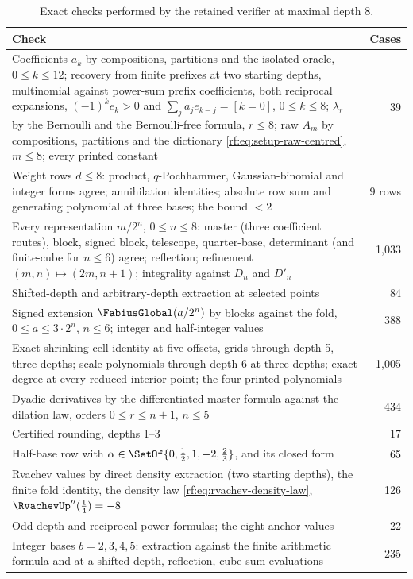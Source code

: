 \documentclass[11pt,oneside]{article}
\theoremstyle{plain}
\theoremstyle{definition}
\theoremstyle{remark}
\newcommand{\Fg}{\FabiusGlobal}             %
\newcommand{\up}{\RvachevUp}                %
\begin{document}
\begin{table}[htbp]
\centering
\caption{Exact checks performed by the retained verifier at maximal depth 8.}
\label{rf:tab:examples-checks}
\small
\begin{tabularx}{\textwidth}{@{}Xr@{}}
\toprule
Check & Cases\\
\midrule
Coefficients $a_{k}$ by compositions, partitions and the isolated oracle, $0\le k\le12$; recovery from finite prefixes at two starting depths, multinomial against power-sum prefix coefficients, both reciprocal expansions, $(-1)^{k}e_{k}>0$ and $\sum_{j}a_{j}e_{k-j}=[k=0]$, $0\le k\le8$; $\lambda_{r}$ by the Bernoulli and the Bernoulli-free formula, $r\le8$; raw $A_{m}$ by compositions, partitions and the dictionary \cref{rf:eq:setup-raw-centred}, $m\le8$; every printed constant & 39\\
Weight rows $d\le8$: product, $q$-Pochhammer, Gaussian-binomial and integer forms agree; annihilation identities; absolute row sum and generating polynomial at three bases; the bound $<2$ & 9 rows\\
Every representation $m/2^{n}$, $0\le n\le8$: master (three coefficient routes), block, signed block, telescope, quarter-base, determinant (and finite-cube for $n\le6$) agree; reflection; refinement $(m,n)\mapsto(2m,n+1)$; integrality against $D_{n}$ and $D'_{n}$ & 1{,}033\\
Shifted-depth and arbitrary-depth extraction at selected points & 84\\
Signed extension $\Fg(a/2^{n})$ by blocks against the fold, $0\le a\le3\cdot2^{n}$, $n\le6$; integer and half-integer values & 388\\
Exact shrinking-cell identity at five offsets, grids through depth 5, three depths; scale polynomials through depth 6 at three depths; exact degree at every reduced interior point; the four printed polynomials & 1{,}005\\
Dyadic derivatives by the differentiated master formula against the dilation law, orders $0\le r\le n+1$, $n\le5$ & 434\\
Certified rounding, depths 1--3 & 17\\
Half-base row with $\alpha\in\SetOf{0,\tfrac12,1,-2,\tfrac23}$, and its closed form & 65\\
Rvachev values by direct density extraction (two starting depths), the finite fold identity, the density law \cref{rf:eq:rvachev-density-law}, $\up''(\tfrac14)=-8$ & 126\\
Odd-depth and reciprocal-power formulas; the eight anchor values & 22\\
Integer bases $b=2,3,4,5$: extraction against the finite arithmetic formula and at a shifted depth, reflection, cube-sum evaluations & 235\\
\bottomrule
\end{tabularx}
\end{table}
\end{document}
